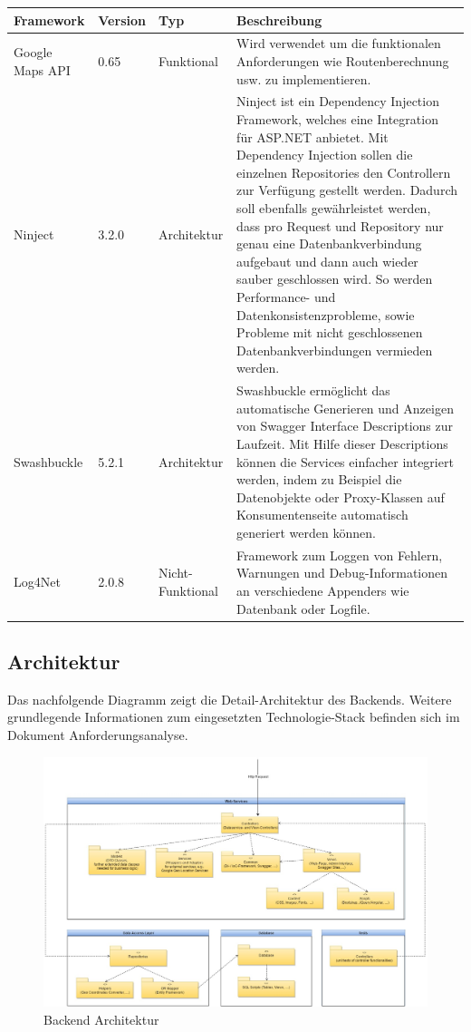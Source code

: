 \documentclass[a4paper,10pt,xetex]{article}
\begin{document}
\begin{longtabu} to \textwidth { | l | l | l | X[l] | }
\hline
\textbf{Framework} & \textbf{Version}  & \textbf{Typ} & \textbf{Beschreibung} \\
\hline
\endhead

Google Maps API &
0.65 &
Funktional &
Wird verwendet um die funktionalen Anforderungen wie Routenberechnung usw. zu
  implementieren.\\\hline
Ninject &
3.2.0 &
Architektur &
Ninject ist ein Dependency Injection Framework, welches eine Integration f\"ur ASP.NET
  anbietet. Mit Dependency Injection sollen die einzelnen Repositories den Controllern zur Verf\"ugung gestellt werden.
  Dadurch soll ebenfalls gew\"ahrleistet werden, dass pro Request und Repository nur genau eine Datenbankverbindung
  aufgebaut und dann auch wieder sauber geschlossen wird. So werden Performance- und Datenkonsistenzprobleme, sowie
  Probleme mit nicht geschlossenen Datenbankverbindungen vermieden werden.\\\hline
Swashbuckle &
5.2.1 &
Architektur &
Swashbuckle erm\"oglicht das automatische Generieren und Anzeigen von Swagger Interface
  Descriptions zur Laufzeit. Mit Hilfe dieser Descriptions k\"onnen die Services einfacher integriert werden, indem zu
  Beispiel die Datenobjekte oder Proxy-Klassen auf Konsumentenseite automatisch generiert werden k\"onnen.\\\hline
Log4Net &
2.0.8 &
Nicht-Funktional &
Framework zum Loggen von Fehlern, Warnungen und Debug-Informationen an verschiedene
  Appenders wie Datenbank oder Logfile.\\\hline
\end{longtabu}


\subsection{Architektur}\label{backendarchitektur}
Das nachfolgende Diagramm zeigt die Detail-Architektur des Backends. Weitere grundlegende
Informationen zum eingesetzten Technologie-Stack befinden sich im Dokument Anforderungsanalyse.

\begin{figure}
  \centering
  \includegraphics{backend_architektur}
  \caption{Backend Architektur}
\end{figure}
\end{document}
